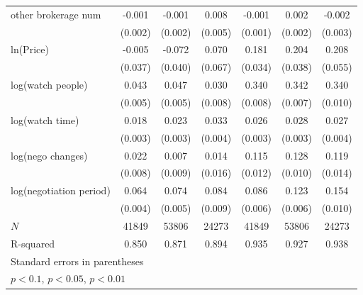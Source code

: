 {\begin{adjustbox}{max width=\textwidth}
\begin{tabular}{l*{6}{c}}
\addlinespace
other brokerage num  &      -0.001         &      -0.001         &       0.008         &      -0.001         &       0.002         &      -0.002         \\
            &     (0.002)         &     (0.002)         &     (0.005)         &     (0.001)         &     (0.002)         &     (0.003)         \\
\addlinespace
ln(Price)&      -0.005         &      -0.072\sym{*}  &       0.070         &       0.181\sym{***}&       0.204\sym{***}&       0.208\sym{***}\\
            &     (0.037)         &     (0.040)         &     (0.067)         &     (0.034)         &     (0.038)         &     (0.055)         \\
\addlinespace
log(watch people)&       0.043\sym{***}&       0.047\sym{***}&       0.030\sym{***}&       0.340\sym{***}&       0.342\sym{***}&       0.340\sym{***}\\
            &     (0.005)         &     (0.005)         &     (0.008)         &     (0.008)         &     (0.007)         &     (0.010)         \\
\addlinespace
log(watch time)&       0.018\sym{***}&       0.023\sym{***}&       0.033\sym{***}&       0.026\sym{***}&       0.028\sym{***}&       0.027\sym{***}\\
            &     (0.003)         &     (0.003)         &     (0.004)         &     (0.003)         &     (0.003)         &     (0.004)         \\
\addlinespace
log(nego changes)&       0.022\sym{***}&       0.007         &       0.014         &       0.115\sym{***}&       0.128\sym{***}&       0.119\sym{***}\\
            &     (0.008)         &     (0.009)         &     (0.016)         &     (0.012)         &     (0.010)         &     (0.014)         \\
\addlinespace
log(negotiation period)&       0.064\sym{***}&       0.074\sym{***}&       0.084\sym{***}&       0.086\sym{***}&       0.123\sym{***}&       0.154\sym{***}\\
            &     (0.004)         &     (0.005)         &     (0.009)         &     (0.006)         &     (0.006)         &     (0.010)         \\
\midrule
\(N\)       &       41849         &       53806         &       24273         &       41849         &       53806         &       24273         \\
R-squared   &       0.850         &       0.871         &       0.894         &       0.935         &       0.927         &       0.938         \\
\bottomrule
\multicolumn{7}{l}{\footnotesize Standard errors in parentheses}\\
\multicolumn{7}{l}{\footnotesize \sym{*} \(p<0.1\), \sym{**} \(p<0.05\), \sym{***} \(p<0.01\)}\\
\end{tabular}
\end{adjustbox}
}
